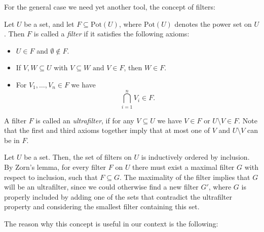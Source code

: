 For the general case we need yet another tool, the concept of filters:

\begin{defn}
Let $U$ be a set, and let $F \subseteq \text{Pot}(U)$, where $\text{Pot}(U)$ denotes the power set on $U$. Then $F$ is called a \emph{filter} if it satisfies the following axioms: 
\begin{itemize}
\item  $U \in F$ and $\emptyset \notin F$.
\item If $V,W \subseteq U$ with $V \subseteq W \text{ and }V  \in F $, then $W \in F$.
\item For $V_1, \ldots, V_n \in F$ we have \[ \bigcap_{i = 1}^n V_i \in F. \]
\end{itemize}
A filter $F$ is called an \emph{ultrafilter}, if for any $V \subseteq U$ we have $V \in F$ or $U \setminus V \in F$. Note that the first and third axioms together imply that at most one of $V$ and $U \setminus V$ can be in $F$.
\end{defn}



\begin{rem}
Let $U$ be a set. Then, the set of filters on $U$ is inductively ordered by inclusion. By Zorn's lemma, for every filter $F$ on $U$ there must exist a maximal filter $G$ with respect to inclusion, such that $F \subseteq G$.
The maximality of the filter implies that $G$ will be an ultrafilter, since we could otherwise find a new filter $G'$, where $G$ is properly included by adding one of the sets that contradict the ultrafilter property and considering the smallest filter containing this set.
\end{rem}

The reason why this concept is useful in our context is the following:

